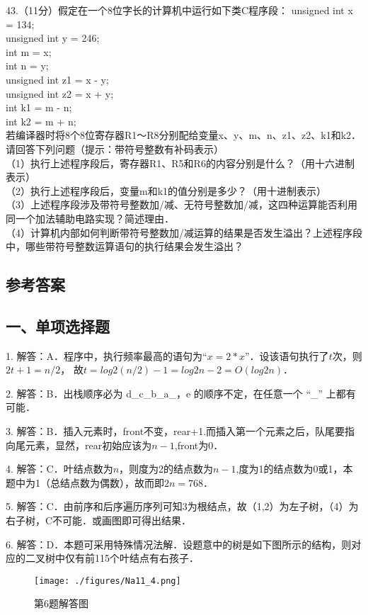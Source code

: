 43.（11分）假定在一个8位字长的计算机中运行如下类C程序段：
unsigned int x = 134; \\
unsigned int y = 246; \\
int m = x; \\
int n = y; \\
unsigned int z1 = x - y; \\
unsigned int z2 = x + y; \\
int k1 = m - n; \\
int k2 = m + n; \\
若编译器时将8个8位寄存器R1～R8分别配给变量x、y、m、n、z1、z2、k1和k2．请回答下列问题（提示：带符号整数有补码表示） \\
（1）执行上述程序段后，寄存器R1、R5和R6的内容分别是什么？（用十六进制表示） \\
（2）执行上述程序段后，变量m和k1的值分别是多少？（用十进制表示）  \\
（3）上述程序段涉及带符号整数加/减、无符号整数加/减，这四种运算能否利用同一个加法辅助电路实现？简述理由． \\
（4）计算机内部如何判断带符号整数加/减运算的结果是否发生溢出？上述程序段中，哪些带符号整数运算语句的执行结果会发生溢出？




\subsection{参考答案}
\subsection{一、单项选择题}
1. 解答：A．程序中，执行频率最高的语句为“$x=2*x$”．设该语句执行了$t$次，则$2t+1=n/2$， 故$t=log2(n/2)-1=log2n-2= O(log2n)$．

2. 解答：B．出栈顺序必为 d\_c\_b\_a\_，e 的顺序不定，在任意一个 “\_” 上都有可能．

3. 解答：B．插入元素时，front不变，rear+1.而插入第一个元素之后，队尾要指向尾元素，显然，rear初始应该为$n-1$,front为$0$．

4. 解答：C．叶结点数为$n$，则度为2的结点数为$n-1$,度为1的结点数为0或1，本题中为1（总结点数为偶数），故而即$2n=768$．

5. 解答：C．由前序和后序遍历序列可知3为根结点，故（1,2）为左子树，（4）为右子树，C不可能．或画图即可得出结果．

6. 解答：D．本题可采用特殊情况法解．设题意中的树是如下图所示的结构，则对应的二叉树中仅有前115个叶结点有右孩子．\\
\begin{figure}[ht]
\centering
\texttt{[image: ./figures/Na11\_4.png]}
\caption{第6题解答图} \label{Na11_fig4}
\end{figure}

